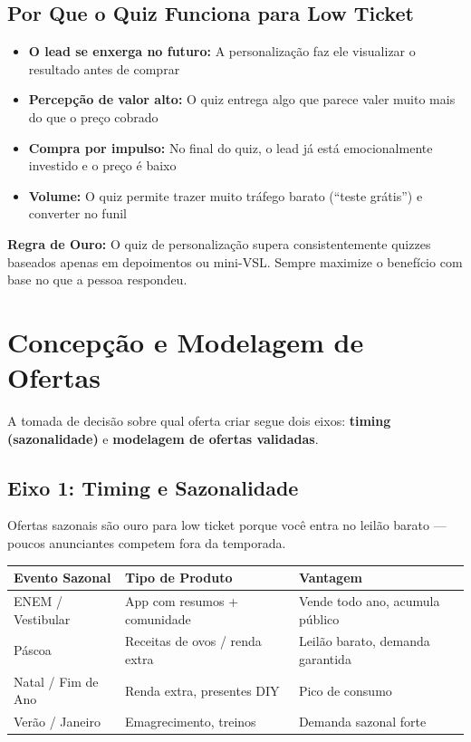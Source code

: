 \documentclass[12pt, a4paper]{article}
\begin{document}
\subsection{Por Que o Quiz Funciona para Low Ticket}

\begin{itemize}
    \item \textbf{O lead se enxerga no futuro:} A personalização faz ele visualizar o resultado antes de comprar
    \item \textbf{Percepção de valor alto:} O quiz entrega algo que parece valer muito mais do que o preço cobrado
    \item \textbf{Compra por impulso:} No final do quiz, o lead já está emocionalmente investido e o preço é baixo
    \item \textbf{Volume:} O quiz permite trazer muito tráfego barato (``teste grátis'') e converter no funil
\end{itemize}

\textcolor{accentColor}{\textbf{Regra de Ouro:}} O quiz de personalização supera consistentemente quizzes baseados apenas em depoimentos ou mini-VSL. Sempre maximize o benefício com base no que a pessoa respondeu.

\needspace{10cm}

\section{Concepção e Modelagem de Ofertas}

A tomada de decisão sobre qual oferta criar segue dois eixos: \textbf{timing (sazonalidade)} e \textbf{modelagem de ofertas validadas}.

\subsection{Eixo 1: Timing e Sazonalidade}

Ofertas sazonais são ouro para low ticket porque você entra no leilão barato --- poucos anunciantes competem fora da temporada.

\begin{table}[H]
    \centering
    \renewcommand{\arraystretch}{1.4}
    \begin{tabularx}{\textwidth}{X X X}
        \toprule
        \rowcolor{tableHeader} \textbf{Evento Sazonal} & \textbf{Tipo de Produto} & \textbf{Vantagem} \\
        \midrule
        ENEM / Vestibular & App com resumos + comunidade & Vende todo ano, acumula público \\
        \rowcolor{lightGray}
        Páscoa & Receitas de ovos / renda extra & Leilão barato, demanda garantida \\
        Natal / Fim de Ano & Renda extra, presentes DIY & Pico de consumo \\
        \rowcolor{lightGray}
        Verão / Janeiro & Emagrecimento, treinos & Demanda sazonal forte \\
        \bottomrule
    \end{tabularx}
\end{table}
\end{document}
